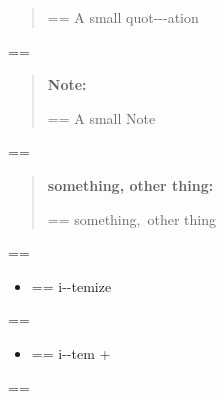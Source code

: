 \documentclass{book}
\makeatletter
\newenvironment{Texinfopreformatted}{%
  \par\GNUTobeylines\obeyspaces\frenchspacing\parskip=\z@\parindent=\z@}{}
{\catcode`\^^M=13 \gdef\GNUTobeylines{\catcode`\^^M=13 \def^^M{\null\par}}}
\newenvironment{Texinfoindented}{\begin{list}{}{}\item\relax}{\end{list}}
\renewcommand{\_}{\Texinfounderscore\discretionary{}{}{}}
\makeatother
\begin{document}
\begin{Texinfoindented}
\begin{quote}
\begin{footnotesize}
\begin{Texinfopreformatted}%
\ttfamily A small quot{-}{-}{-}ation
\end{Texinfopreformatted}
\end{footnotesize}
\end{quote}
\begin{Texinfopreformatted}%
\ttfamily 
\end{Texinfopreformatted}
\begin{quote}
\begin{footnotesize}
\textbf{Note:} \begin{Texinfopreformatted}%
\ttfamily A small Note
\end{Texinfopreformatted}
\end{footnotesize}
\end{quote}
\begin{Texinfopreformatted}%
\ttfamily 
\end{Texinfopreformatted}
\begin{quote}
\begin{footnotesize}
\textbf{something, other thing:} \begin{Texinfopreformatted}%
\ttfamily something,\ other thing
\end{Texinfopreformatted}
\end{footnotesize}
\end{quote}
\begin{Texinfopreformatted}%
\ttfamily 
\end{Texinfopreformatted}
\begin{itemize}
\item \begin{Texinfopreformatted}%
\ttfamily i{-}{-}temize
\end{Texinfopreformatted}
\end{itemize}
\begin{Texinfopreformatted}%
\ttfamily 
\end{Texinfopreformatted}
\begin{itemize}[label=+]
\item \begin{Texinfopreformatted}%
\ttfamily i{-}{-}tem +
\end{Texinfopreformatted}
\end{itemize}
\begin{Texinfopreformatted}%
\ttfamily 
\end{Texinfopreformatted}
\begin{itemize}[label=\textbullet{}]

\end{itemize}
\end{Texinfoindented}
\end{document}
